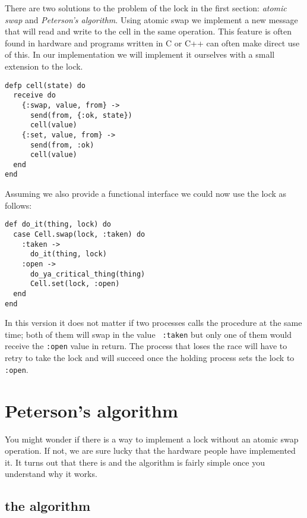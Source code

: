 \documentclass[a4paper,11pt]{article}
\begin{document}
There are two solutions to the problem of the lock in the first
section: {\em atomic swap} and {\em Peterson's algorithm}. Using atomic
swap we implement a new message that will read and write to the cell
in the same operation. This feature is often found in hardware and
programs written in C or C++ can often make direct use of this. In our
implementation we will implement it ourselves with a small extension to the lock. 

\begin{verbatim}
defp cell(state) do
  receive do
    {:swap, value, from} ->
      send(from, {:ok, state})
      cell(value)
    {:set, value, from} ->
      send(from, :ok)
      cell(value)
  end
end
\end{verbatim}

Assuming we also provide a functional interface we could now use the lock as follows:

\pagebreak

\begin{verbatim}
def do_it(thing, lock) do
  case Cell.swap(lock, :taken) do
    :taken ->
      do_it(thing, lock)
    :open ->
      do_ya_critical_thing(thing)
      Cell.set(lock, :open)
  end
end
\end{verbatim}

In this version it does not matter if two processes calls the
procedure at the same time; both of them will swap in the value {\tt
  :taken} but only one of them would receive the {\tt :open} value in
return. The process that loses the race will have to retry to take
the lock and will succeed once the holding process sets the lock to
{\tt :open}.



\section{Peterson's algorithm}

You might wonder if there is a way to implement a lock without an
atomic swap operation. If not, we are sure lucky that the hardware
people have implemented it. It turns out that there is and the
algorithm is fairly simple once you understand why it works.


\subsection{the algorithm}
\end{document}
